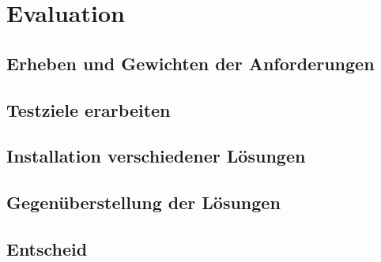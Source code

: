
\section{Evaluation}

\subsection{Erheben und Gewichten der Anforderungen}

\subsection{Testziele erarbeiten}


\subsection{Installation verschiedener Lösungen}





\subsection{Gegenüberstellung der Lösungen}


\subsection{Entscheid}
